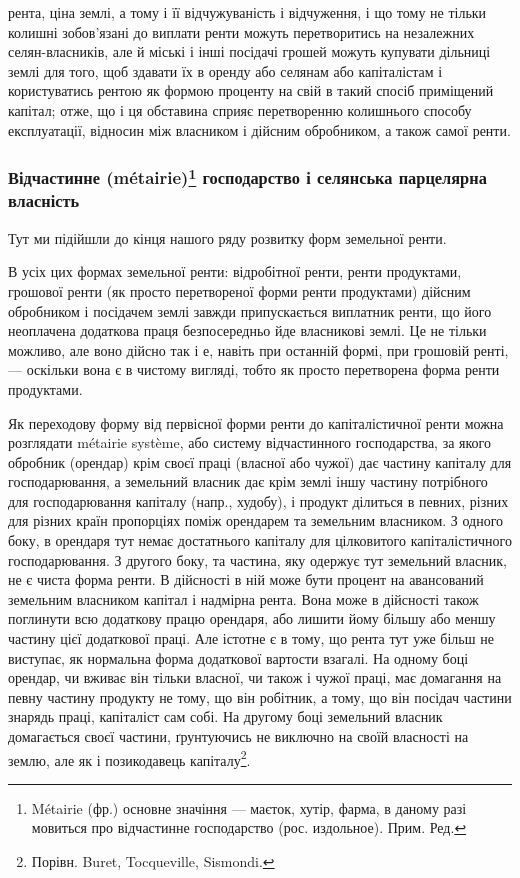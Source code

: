 \parcont{}  %
рента, ціна землі, а тому і її відчужуваність і відчуження, і що тому не тільки
колишні зобов’язані до виплати ренти можуть перетворитись на незалежних
селян-власників, але й міські і інші посідачі грошей можуть купувати дільниці
землі для того, щоб здавати їх в оренду або селянам або капіталістам
і користуватись рентою як формою проценту на свій в такий спосіб приміщений
капітал; отже, що і ця обставина сприяє перетворенню колишнього способу
експлуатації, відносин між власником і дійсним обробником, а також самої ренти.

\subsubsection{Відчастинне (métairie)\footnote*{
Métairie (фр.) основне значіння — маєток, хутір, фарма, в даному разі мовиться про відчастинне
господарство (рос. издольное). Прим. Ред.
} господарство і селянська парцелярна
власність}

Тут ми підійшли до кінця нашого ряду розвитку форм земельної ренти.

В усіх цих формах земельної ренти: відробітної ренти, ренти продуктами,
грошової ренти (як просто перетвореної форми ренти продуктами) дійсним
обробником і посідачем землі завжди припускається виплатник ренти, що його
неоплачена додаткова праця безпосередньо йде власникові землі. Це не тільки
можливо, але воно дійсно так і е, навіть при останній формі, при грошовій
ренті, — оскільки вона є в чистому вигляді, тобто як просто перетворена форма
ренти продуктами.

Як переходову форму від первісної форми ренти до капіталістичної ренти
можна розглядати métairie système, або систему відчастинного господарства, за якого
обробник (орендар) крім своєї праці (власної або чужої) дає частину капіталу
для господарювання, а земельний власник дає крім землі іншу частину потрібного
для господарювання капіталу (напр., худобу), і продукт ділиться в певних,
різних для різних країн пропорціях поміж орендарем та земельним власником.
З одного боку, в орендаря тут немає достатнього капіталу для цілковитого капіталістичного
господарювання. З другого боку, та частина, яку одержує тут
земельний власник, не є чиста форма ренти. В дійсності в ній може бути процент
на авансований земельним власником капітал і надмірна рента. Вона може
в дійсності також поглинути всю додаткову працю орендаря, або лишити йому
більшу або меншу частину цієї додаткової праці. Але істотне є в тому, що
рента тут уже більш не виступає, як нормальна форма додаткової вартости взагалі.
На одному боці орендар, чи вживає він тільки власної, чи також і чужої праці,
має домагання на певну частину продукту не тому, що він робітник, а тому,
що він посідач частини знарядь праці, капіталіст сам собі. На другому боці
земельний власник домагається своєї частини, ґрунтуючись не виключно на
своїй власності на землю, але як і позикодавець капіталу\footnote{
Порівн. Buret, Tocqueville, Sismondi.
}.

